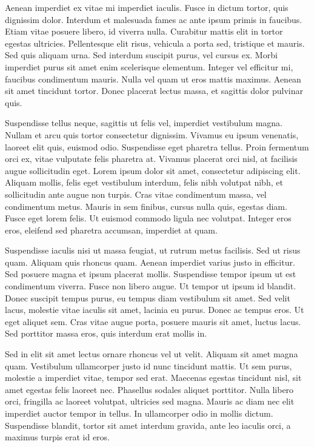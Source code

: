 
Aenean imperdiet ex vitae mi imperdiet iaculis. Fusce in dictum tortor, quis dignissim dolor.
Interdum et malesuada fames ac ante ipsum primis in faucibus. Etiam vitae posuere libero,
id viverra nulla. Curabitur mattis elit in tortor egestas ultricies. Pellentesque elit risus,
vehicula a porta sed, tristique et mauris. Sed quis aliquam urna. Sed interdum suscipit purus,
vel cursus ex. Morbi imperdiet purus sit amet enim scelerisque elementum. Integer vel efficitur
mi, faucibus condimentum mauris. Nulla vel quam ut eros mattis maximus. Aenean sit amet tincidunt
tortor. Donec placerat lectus massa, et sagittis dolor pulvinar quis.

Suspendisse tellus neque, sagittis ut felis vel, imperdiet vestibulum magna. Nullam et arcu
quis tortor consectetur dignissim. Vivamus eu ipsum venenatis, laoreet elit quis, euismod
odio. Suspendisse eget pharetra tellus. Proin fermentum orci ex, vitae vulputate felis pharetra
at. Vivamus placerat orci nisl, at facilisis augue sollicitudin eget. Lorem ipsum dolor
sit amet, consectetur adipiscing elit. Aliquam mollis, felis eget vestibulum interdum, felis
nibh volutpat nibh, et sollicitudin ante augue non turpis. Cras vitae condimentum massa,
vel condimentum metus. Mauris in sem finibus, cursus nulla quis, egestas diam. Fusce eget
lorem felis. Ut euismod commodo ligula nec volutpat. Integer eros eros, eleifend sed pharetra
accumsan, imperdiet at quam.


Suspendisse iaculis nisi ut massa feugiat, ut rutrum metus facilisis. Sed ut risus quam.
Aliquam quis rhoncus quam. Aenean imperdiet varius justo in efficitur. Sed posuere magna
et ipsum placerat mollis. Suspendisse tempor ipsum ut est condimentum viverra. Fusce non
libero augue. Ut tempor ut ipsum id blandit. Donec suscipit tempus purus, eu tempus diam
vestibulum sit amet. Sed velit lacus, molestie vitae iaculis sit amet, lacinia eu purus.
Donec ac tempus eros. Ut eget aliquet sem. Cras vitae augue porta, posuere mauris sit amet,
luctus lacus. Sed porttitor massa eros, quis interdum erat mollis in.

Sed in elit sit amet lectus ornare rhoncus vel ut velit. Aliquam sit amet magna quam. Vestibulum
ullamcorper justo id nunc tincidunt mattis. Ut sem purus, molestie a imperdiet vitae, tempor
sed erat. Maecenas egestas tincidunt nisl, sit amet egestas felis laoreet nec. Phasellus
sodales aliquet porttitor. Nulla libero orci, fringilla ac laoreet volutpat, ultricies sed
magna. Mauris ac diam nec elit imperdiet auctor tempor in tellus. In ullamcorper odio in
mollis dictum. Suspendisse blandit, tortor sit amet interdum gravida, ante leo iaculis orci,
a maximus turpis erat id eros.

